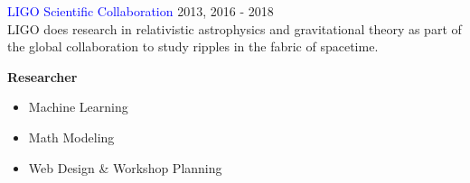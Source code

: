 \documentclass[12pt]{resume}
\begin{document}
\begin{minipage}[t]{0.45\textwidth}
        \textcolor{blue}{LIGO Scientific Collaboration} {\hfill 2013, 2016 - 2018} \\
        LIGO does research in relativistic astrophysics and gravitational
        theory as part of the global collaboration to study ripples in the
        fabric of spacetime.
        \begin{spacing}{1.2}
            {\bf Researcher}
        \end{spacing}
        \vspace{-2mm}
        \begin{itemize}
            \setlength\itemsep{-.2em}
            \item {Machine Learning}
            \item {Math Modeling}
            \item {Web Design \& Workshop Planning}
        \end{itemize}

    \end{minipage}
    \hspace{5mm}
\end{document}
